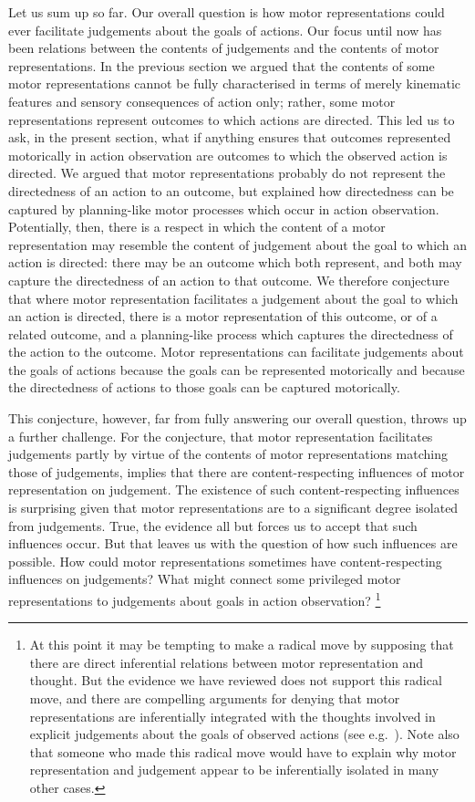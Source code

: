 \documentclass[12pt,\papersize]{extarticle}
\begin{document}
Let us sum up so far. Our overall question is how motor representations could ever facilitate judgements about the goals of actions.  Our focus until now has been relations between the contents of judgements and the contents of motor representations.  
In the previous section we argued that the contents of some motor representations cannot be fully characterised in terms of merely kinematic features and sensory consequences of action only; rather, some motor representations represent outcomes to which actions are directed.  
This led us to ask, in the present section, what if anything ensures that outcomes represented motorically in action observation are outcomes to which the observed action is directed.  We argued that motor representations probably do not represent the directedness of an action to an outcome, but explained how directedness can be captured by planning-like motor processes which occur in action observation.  Potentially, then, there is a respect in which the content of a motor representation may resemble the content of judgement about the goal to which an action is directed: there may be an outcome which both represent, and both may  capture the directedness of an action to that outcome.  
We therefore conjecture that where motor representation facilitates a judgement about the goal to which an action is directed, there is a motor representation of this outcome, or of a related outcome, and a planning-like process which captures the directedness of the action to the outcome.  Motor representations can facilitate judgements about the goals of actions because the goals can be represented motorically and because the directedness of actions to those goals can be captured motorically.

This conjecture, however, far from fully answering our overall question, throws up a further challenge.  For the conjecture, that motor representation facilitates judgements partly by virtue of the contents of motor representations matching those of judgements, implies that there are content-respecting influences of motor representation on judgement.  The existence of such content-respecting influences is surprising given that motor representations are to a significant degree isolated from judgements. True, the evidence all but forces us to accept that such influences occur.  But that leaves us with the question of how such influences are possible. How could motor representations sometimes have content-respecting influences on judgements?  What might connect some privileged motor representations to judgements about goals in action observation?%
\footnote{
At this point it may be tempting to make a radical move by supposing that there are direct inferential relations between motor representation and thought.  But the evidence we have reviewed does not support this radical move, and there are compelling arguments for denying that motor representations are inferentially integrated with the thoughts involved in explicit judgements about the goals of observed actions (see e.g.\ \citealp{butterfill:2012_intention}).
 Note also that someone who made this radical move would have to explain why motor representation and judgement appear to be inferentially isolated in many other cases.}
\end{document}
